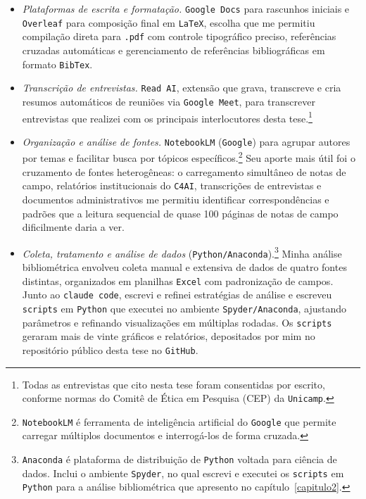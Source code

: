 \begin{itemize}
\item \textit{Plataformas de escrita e formatação.} \texttt{Google Docs} para rascunhos iniciais e \texttt{Overleaf} para composição final em \texttt{LaTeX}{}, escolha que me permitiu compilação direta para \texttt{.pdf} com controle tipográfico preciso, referências cruzadas automáticas e gerenciamento de referências bibliográficas em formato \texttt{BibTex}.

\item \textit{Transcrição de entrevistas.} \texttt{Read AI}, extensão que grava, transcreve e cria resumos automáticos de reuniões via \texttt{Google Meet}, para transcrever entrevistas que realizei com os principais interlocutores desta tese.\footnote{Todas as entrevistas que cito nesta tese foram consentidas por escrito, conforme normas do Comitê de Ética em Pesquisa (CEP) da \texttt{Unicamp}.}

\item \textit{Organização e análise de fontes.} \texttt{NotebookLM} (\texttt{Google}) para agrupar autores por temas e facilitar busca por tópicos específicos.\footnote{\texttt{NotebookLM} é ferramenta de inteligência artificial do \texttt{Google} que permite carregar múltiplos documentos e interrogá-los de forma cruzada.} Seu aporte mais útil foi o cruzamento de fontes heterogêneas: o carregamento simultâneo de notas de campo, relatórios institucionais do \texttt{C4AI}, transcrições de entrevistas e documentos administrativos me permitiu identificar correspondências e padrões que a leitura sequencial de quase 100 páginas de notas de campo dificilmente daria a ver.

\item \textit{Coleta, tratamento e análise de dados} (\texttt{Python/Anaconda}).\footnote{\texttt{Anaconda} é plataforma de distribuição de \texttt{Python} voltada para ciência de dados. Inclui o ambiente \texttt{Spyder}, no qual escrevi e executei os \texttt{scripts} em \texttt{Python} para a análise bibliométrica que apresento no capítulo~\ref{capitulo2}.} Minha análise bibliométrica envolveu coleta manual e extensiva de dados de quatro fontes distintas, organizados em planilhas \texttt{Excel} com padronização de campos. Junto ao \texttt{claude code}, escrevi e refinei estratégias de análise e escreveu \texttt{scripts} em \texttt{Python} que executei no ambiente \texttt{Spyder/Anaconda}, ajustando parâmetros e refinando visualizações em múltiplas rodadas. Os \texttt{scripts} geraram mais de vinte gráficos e relatórios, depositados por mim no repositório público desta tese no \texttt{GitHub}.


\end{itemize}

